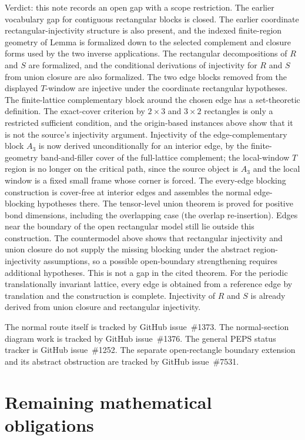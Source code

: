 \documentclass{article}
\providecommand{\ghissue}[1]{GitHub issue~\##1}
\begin{document}
Verdict: this note records an open gap with a scope restriction. The earlier
vocabulary gap for contiguous rectangular blocks is closed. The earlier
coordinate rectangular-injectivity structure is also present, and the
indexed finite-region geometry of Lemma  is formalized
down to the selected complement and closure forms used by the two inverse
applications. The rectangular decompositions of $R$ and $S$ are formalized, and
the conditional derivations of injectivity for $R$ and $S$ from union closure
are also formalized. The two edge blocks removed from the displayed $T$-window
are injective under the coordinate rectangular hypotheses. The finite-lattice
complementary block around the chosen edge has a set-theoretic definition.
The exact-cover criterion by $2\times3$ and $3\times2$ rectangles is only a
restricted sufficient condition, and the origin-based instances above show
that it is not the source's injectivity argument. Injectivity of the
edge-complementary block $A_3$ is now derived unconditionally for an interior
edge, by the finite-geometry band-and-filler cover of the full-lattice
complement; the local-window $T$ region is no longer on the critical path,
since the source object is $A_3$ and the local window is a fixed small frame
whose corner is forced. The every-edge blocking construction is cover-free at
interior edges and assembles the normal edge-blocking hypotheses there. The
tensor-level union theorem is proved for positive bond dimensions, including the
overlapping case (the overlap re-insertion). Edges near the boundary of the open
rectangular model still lie outside this construction. The countermodel above
shows that rectangular injectivity and union closure do not supply the missing
blocking under the abstract region-injectivity assumptions, so a possible
open-boundary strengthening requires additional hypotheses. This is not a gap
in the cited theorem.
For the periodic translationally invariant lattice, every edge is obtained from
a reference edge by translation and the construction is complete. Injectivity
of $R$ and $S$ is already derived from union closure and rectangular injectivity.

The normal route itself is tracked by \ghissue{1373}. The normal-section
diagram work is tracked by \ghissue{1376}. The general PEPS status tracker is
\ghissue{1252}. The separate open-rectangle boundary extension and its
abstract obstruction are tracked by \ghissue{7531}.

\section{Remaining mathematical obligations}
\end{document}
